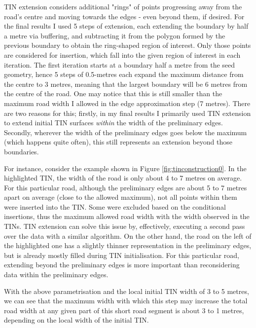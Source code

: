 TIN extension considers additional "rings" of points progressing away from the road's centre and moving towards the edges - even beyond them, if desired. For the final results I used 5 steps of extension, each extending the boundary by half a metre via buffering, and subtracting it from the polygon formed by the previous boundary to obtain the ring-shaped region of interest. Only those points are considered for insertion, which fall into the given region of interest in each iteration. The first iteration starts at a boundary half a metre from the seed geometry, hence 5 steps of 0.5-metres each expand the maximum distance from the centre to 3 metres, meaning that the largest boundary will be 6 metres from the centre of the road. One may notice that this is still smaller than the maximum road width I allowed in the edge approximation step (7 metres). There are two reasons for this; firstly, in my final results I primarily used TIN extension to extend initial TIN surfaces \textit{within} the width of the preliminary edges. Secondly, wherever the width of the preliminary edges goes below the maximum (which happens quite often), this still represents an extension beyond those boundaries.

For instance, consider the example shown in Figure \ref{fig:tinconstruction0}. In the highlighted TIN, the width of the road is only about 4 to 7 metres on average. For this particular road, although the preliminary edges are about 5 to 7 metres apart on average (close to the allowed maximum), not all points within them were inserted into the TIN. Some were excluded based on the conditional insertions, thus the maximum allowed road width with the width observed in the TINs. TIN extension can solve this issue by, effectively, executing a second pass over the data with a similar algorithm. On the other hand, the road on the left of the highlighted one has a slightly thinner representation in the preliminary edges, but is already mostly filled during TIN initialisation. For this particular road, extending beyond the preliminary edges is more important than reconsidering data within the preliminary edges.

With the above parametrisation and the local initial TIN width of 3 to 5 metres, we can see that the maximum width with which this step may increase the total road width at any given part of this short road segment is about 3 to 1 metres, depending on the local width of the initial TIN.

